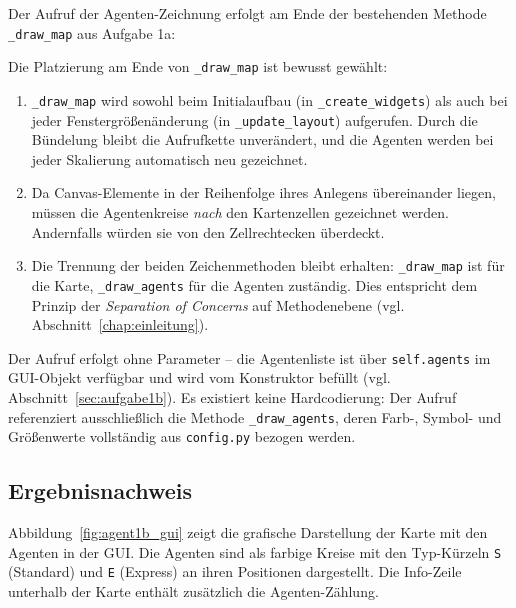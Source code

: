 Der Aufruf der Agenten-Zeichnung erfolgt am Ende der bestehenden Methode \texttt{\_draw\_map} aus Aufgabe 1a:



Die Platzierung am Ende von \texttt{\_draw\_map} ist bewusst gewählt:
\begin{enumerate}
    \item \texttt{\_draw\_map} wird sowohl beim Initialaufbau (in \texttt{\_create\_widgets}) als auch bei jeder Fenstergrößenänderung (in \texttt{\_update\_layout}) aufgerufen. Durch die Bündelung bleibt die Aufrufkette unverändert, und die Agenten werden bei jeder Skalierung automatisch neu gezeichnet.
    \item Da Canvas-Elemente in der Reihenfolge ihres Anlegens übereinander liegen, müssen die Agentenkreise \textit{nach} den Kartenzellen gezeichnet werden. Andernfalls würden sie von den Zellrechtecken überdeckt.
    \item Die Trennung der beiden Zeichenmethoden bleibt erhalten: \texttt{\_draw\_map} ist für die Karte, \texttt{\_draw\_agents} für die Agenten zuständig. Dies entspricht dem Prinzip der \textit{Separation of Concerns} auf Methodenebene (vgl. Abschnitt~\ref{chap:einleitung}).
\end{enumerate}

Der Aufruf erfolgt ohne Parameter -- die Agentenliste ist über \texttt{self.agents} im \acs{GUI}-Objekt verfügbar und wird vom Konstruktor befüllt (vgl. Abschnitt~\ref{sec:aufgabe1b}). Es existiert keine Hardcodierung: Der Aufruf referenziert ausschließlich die Methode \texttt{\_draw\_agents}, deren Farb-, Symbol- und Größenwerte vollständig aus \texttt{config.py} bezogen werden.


\subsection{Ergebnisnachweis}
\label{sssec:agent_ergebnisnachweis}

Abbildung~\ref{fig:agent1b_gui} zeigt die grafische Darstellung der Karte mit den Agenten in der \acs{GUI}. Die Agenten sind als farbige Kreise mit den Typ-Kürzeln \texttt{\acs{S}} (Standard) und \texttt{\acs{E}} (Express) an ihren Positionen dargestellt. Die Info-Zeile unterhalb der Karte enthält zusätzlich die Agenten-Zählung.

